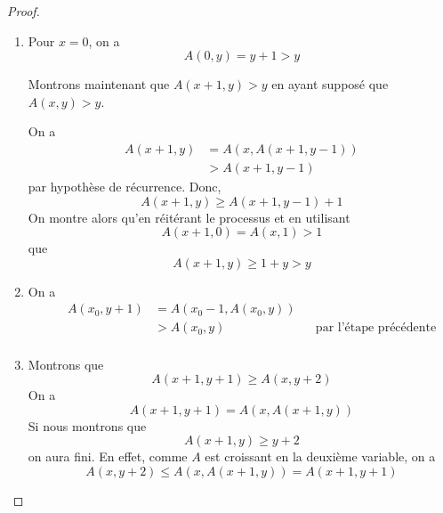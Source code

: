 \ifdefined\outputproof
\begin{proof}
	\begin{enumerate}
		\item Pour $x = 0$, on a
			\begin{equation}
				A(0, y) = y + 1 > y
			\end{equation}

			Montrons maintenant que $A(x + 1, y) > y$ en ayant supposé que $A(x,
			y) > y$.

			On a 
			\begin{align}
				&& A(x + 1, y) & = A(x, A(x + 1, y - 1)) && \\
				&& & > A(x + 1, y - 1) &&
			\end{align}
			par hypothèse de récurrence. Donc,
			\begin{equation}
				A(x + 1, y) \geq A(x + 1, y - 1) + 1
			\end{equation}
			On montre alors qu'en réitérant le processus et en utilisant
			\begin{equation}
				A(x + 1, 0) = A(x, 1) > 1
			\end{equation}
			que
			\begin{equation}
				A(x + 1, y) \geq 1 + y > y
			\end{equation}
		\item On a 
			\begin{align}
				&& A(x_{0}, y + 1) & = A(x_{0} - 1, A(x_{0}, y)) && \\
				&& & > A(x_{0}, y) && \text{par l'étape précédente} \\
			\end{align}
		\item Montrons que
			\begin{equation}
				A(x + 1, y + 1) \geq A(x, y + 2)
			\end{equation}
			On a
			\begin{equation}
				A(x + 1, y + 1) = A(x, A(x + 1, y))
			\end{equation}
			Si nous montrons que
			\begin{equation}
				A(x + 1, y) \geq y + 2
			\end{equation}
			on aura fini. En effet, comme $A$ est croissant en la deuxième
			variable, on a
			\begin{equation}
				A(x, y + 2) \leq A(x, A(x + 1, y)) = A(x + 1, y + 1)
			\end{equation}


\end{enumerate}
\end{proof}
